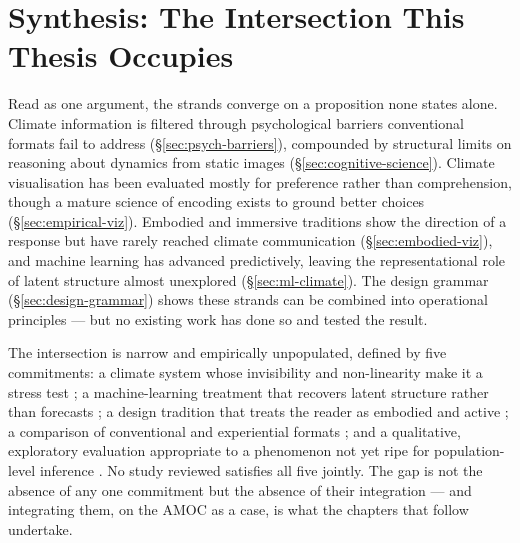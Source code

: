 \section{Synthesis: The Intersection This Thesis Occupies}
\label{sec:literature-synthesis}

Read as one argument, the strands converge on a proposition none states alone. Climate information is filtered through psychological barriers conventional formats fail to address (\S\ref{sec:psych-barriers}), compounded by structural limits on reasoning about dynamics from static images (\S\ref{sec:cognitive-science}). Climate visualisation has been evaluated mostly for preference rather than comprehension, though a mature science of encoding exists to ground better choices (\S\ref{sec:empirical-viz}). Embodied and immersive traditions show the direction of a response but have rarely reached climate communication (\S\ref{sec:embodied-viz}), and machine learning has advanced predictively, leaving the representational role of latent structure almost unexplored (\S\ref{sec:ml-climate}). The design grammar (\S\ref{sec:design-grammar}) shows these strands can be combined into operational principles --- but no existing work has done so and tested the result.

The intersection is narrow and empirically unpopulated, defined by five commitments: a climate system whose invisibility and non-linearity make it a stress test \citep{lenton2008, armstrongmckay2022}; a machine-learning treatment that recovers latent structure rather than forecasts \citep{sonnewald2019, iten2020}; a design tradition that treats the reader as embodied and active \citep{lakoff1999, jansen2015, marriott2018}; a comparison of conventional and experiential formats \parencite{harold2016, hegarty2012}; and a qualitative, exploratory evaluation appropriate to a phenomenon not yet ripe for population-level inference \citep{braunclarke2006}. No study reviewed satisfies all five jointly. The gap is not the absence of any one commitment but the absence of their integration --- and integrating them, on the AMOC as a case, is what the chapters that follow undertake.